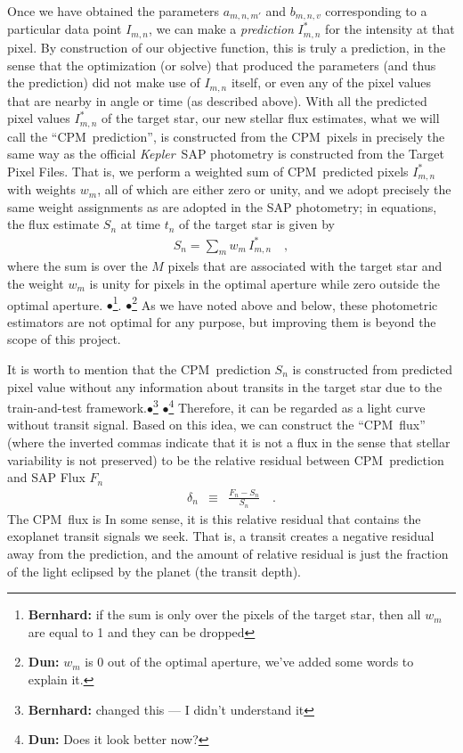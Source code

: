 \documentclass[12pt, preprint]{aastex}
\newcommand{\project}[1]{\textsl{#1}}
\newcommand{\Kepler}{\project{Kepler}}
\newcommand{\name}{CPM}
\newcommand{\Bernhard}[1]{$\bullet$\footnote{{\bf Bernhard:} #1}}
\newcommand{\Dun}[1]{$\bullet$\footnote{{\bf Dun:} #1}}
\begin{document}
Once we have obtained the parameters $a_{m,n,m'}$ and $b_{m,n,v}$ corresponding to a particular data point $I_{m,n}$,
  we can make a \emph{prediction} $I^{\ast}_{m,n}$ for the intensity at that pixel.
By construction of our objective function, this is truly a prediction,
  in the sense that the optimization (or solve) that produced the parameters
  (and thus the prediction)
  did not make use of $I_{m,n}$ itself,
  or even any of the pixel values that are nearby in angle or time
  (as described above).
  With all the predicted pixel values $I^{\ast}_{m,n}$ of the target star,  
  our new stellar flux estimates,
  what we will call the ``\name\ prediction'',
  is constructed from the \name\ pixels
  in precisely the same way as the official \Kepler\ SAP photometry
  is constructed from the Target Pixel Files.
That is, we perform a weighted sum of \name\ predicted pixels $I^{\ast}_{m,n}$ with weights $w_m$,
  all of which are either zero or unity,
  and we adopt precisely the same weight assignments as are adopted in the SAP photometry;
  in equations, the flux estimate $S_n$ at time $t_n$ of the target star is given by
\begin{eqnarray}
S_n = \sum_m w_m\,I^{\ast}_{m,n}
\quad ,
\end{eqnarray}
where the sum is over the $M$ pixels that are associated with the target star and the weight $w_m$ is unity for pixels in the optimal
aperture while zero outside the optimal aperture.
 \Bernhard{if the sum is only over the pixels of the target star, then all $w_m$ are equal to 1 and they can be dropped}.
 \Dun{$w_m$ is 0 out of the optimal aperture,  we've added some words to explain it.}
As we have noted above and below, these photometric estimators are not optimal for any purpose,
  but improving them is beyond the scope of this project.

It is worth to mention that the \name\ prediction $S_{n}$ is constructed from predicted pixel value without any information about transits in the target star due to the train-and-test framework.\Bernhard{changed this --- I didn't understand it} \Dun{Does it look better now?} Therefore, it can be regarded as a light curve without transit signal. 
Based on this idea, 
  we can construct the ``\name\ flux'' (where the inverted commas indicate that it is not a flux in the sense that stellar variability is not preserved) to be the relative residual between \name\ prediction and SAP Flux $F_{n}$
\begin{eqnarray}
\delta_{n}&\equiv&\frac{F_{n} - S_{n}}{S_{n}}
\quad .
\end{eqnarray}
The \name\ flux is 
In some sense, it is this relative residual that contains the exoplanet transit signals we seek. 
That is, a transit creates a negative residual away from the prediction, 
  and the amount of relative residual is just the fraction of the light eclipsed by the planet (the transit depth). 
\end{document}
